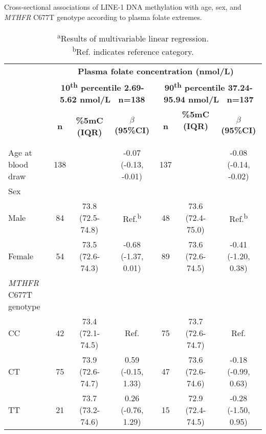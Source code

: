 \begin{flushleft}
\begin{table} [h]
\caption{Cross-sectional associations of LINE-1 DNA methylation with age, sex, and \emph{MTHFR} C677T genotype according to plasma folate extremes.}\label{table3_2}
\begin{adjustbox}{width=\textwidth}
\renewcommand{\arraystretch}{1.3}
\begin{tabular}{lcccccc}
\hline 
~ &\multicolumn{6}{c}{\centering \textbf{Plasma folate concentration (nmol/L)}}\\
\bfseries
&\multicolumn{3}{c}{\parbox[t]{3cm}{\centering \textbf{ 10\textsuperscript{th} percentile 2.69-5.62 nmol/L \ n=138\\}}} 
&\multicolumn{3}{c}{\parbox[t]{3cm}{\centering \textbf{ 90\textsuperscript{th} percentile 37.24-95.94 nmol/L \ n=137\\}}}\\
~ & \textbf{n} & \textbf{\%5mC (IQR)} & \textbf{$\beta$ (95\%CI)} & \textbf{n} & \textbf{ \%5mC (IQR)} ~ & \textbf{$\beta$ (95\%CI)}\\
\hline
Age at blood draw & 138 &~ & {}-0.07 (-0.13, -0.01) & 137 &~ & {}-0.08 (-0.14, -0.02)\\
Sex &~ &~ &~ &~ &~ &~\\ \quad Male & 84 & 73.8 (72.5-74.8) & Ref.\textsuperscript{b} & 48 & 73.6 (72.4-75.0) & Ref.\textsuperscript{b}\\ \quad Female & 54 & 73.5 (72.6-74.3) & {}-0.68 (-1.37, 0.01) & 89 & 73.6 (72.6-74.5) & {}-0.41 (-1.20, 0.38)\\
{\textit{MTHFR}}{ C677T genotype}&~ &~ &~ &~ &~ &~\\ \quad CC & 42 & 73.4 (72.1-74.5) & Ref. & 75 & 73.7 (72.6-74.7) & Ref.\\ \quad CT & 75 & 73.9 (72.6-74.7) & 0.59 (-0.15, 1.33) & 47 & 73.6 (72.6-74.6) & {}-0.18 (-0.99, 0.63)\\ \quad TT & 21 & 73.7 (73.2-74.6) & 0.26 (-0.76, 1.29) & 15 & 72.9 (72.4-74.5) & {}-0.28 (-1.50, 0.95)\\
\hline 
\end{tabular}
\end{adjustbox}
\caption*{\footnotesize{\textsuperscript{a}Results of multivariable linear regression.\\ \textsuperscript{b}Ref. indicates reference category.}}
\end{table}
\end{flushleft}



